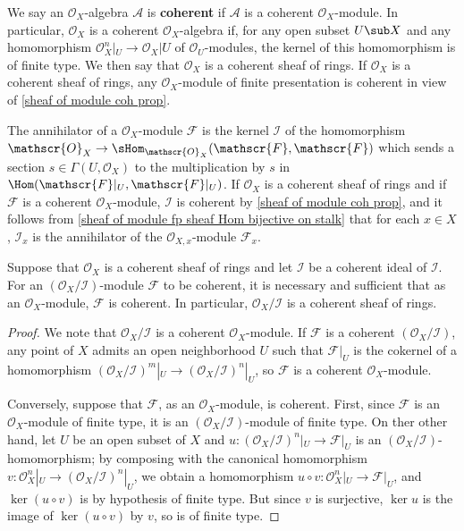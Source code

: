 We say an $\mathscr{O}_X$-algebra $\mathscr{A}$ is \textbf{coherent} if $\mathscr{A}$ is a coherent $\mathscr{O}_X$-module. In particular, $\mathscr{O}_X$ is a coherent $\mathscr{O}_X$-algebra if, for any open subset $U\sub X$ and any homomorphism $\mathscr{O}_X^n|_U\to\mathscr{O}_X|U$ of $\mathscr{O}_U$-modules, the kernel of this homomorphism is of finite type. We then say that $\mathscr{O}_X$ is a coherent sheaf of rings. If $\mathscr{O}_X$ is a coherent sheaf of rings, any $\mathscr{O}_X$-module of finite presentation is coherent in view of \cref{sheaf of module coh prop}.
\begin{example}
The annihilator of a $\mathscr{O}_X$-module $\mathscr{F}$ is the kernel $\mathscr{I}$ of the homomorphism $\mathscr{O}_X\to\sHom_{\mathscr{O}_X}(\mathscr{F},\mathscr{F})$ which sends a section $s\in\Gamma(U,\mathscr{O}_X)$ to the multiplication by $s$ in $\Hom(\mathscr{F}|_U,\mathscr{F}|_U)$. If $\mathscr{O}_X$ is a coherent sheaf of rings and if $\mathscr{F}$ is a coherent $\mathscr{O}_X$-module, $\mathscr{I}$ is coherent by \cref{sheaf of module coh prop}, and it follows from \cref{sheaf of module fp sheaf Hom bijective on stalk} that for each $x\in X$, $\mathscr{I}_x$ is the annihilator of the $\mathscr{O}_{X,x}$-module $\mathscr{F}_x$.
\end{example}
\begin{proposition}\label{sheaf of module O/I coh iff}
Suppose that $\mathscr{O}_X$ is a coherent sheaf of rings and let $\mathscr{I}$ be a coherent ideal of $\mathscr{I}$. For an $(\mathscr{O}_X/\mathscr{I})$-module $\mathscr{F}$ to be coherent, it is necessary and sufficient that as an $\mathscr{O}_X$-module, $\mathscr{F}$ is coherent. In particular, $\mathscr{O}_X/\mathscr{I}$ is a coherent sheaf of rings.
\end{proposition}
\begin{proof}
We note that $\mathscr{O}_X/\mathscr{I}$ is a coherent $\mathscr{O}_X$-module. If $\mathscr{F}$ is a coherent $(\mathscr{O}_X/\mathscr{I})$, any point of $X$ admits an open neighborhood $U$ such that $\mathscr{F}|_U$ is the cokernel of a homomorphism $(\mathscr{O}_X/\mathscr{I})^m|_U\to (\mathscr{O}_X/\mathscr{I})^n|_U$, so $\mathscr{F}$ is a coherent $\mathscr{O}_X$-module.\par
Conversely, suppose that $\mathscr{F}$, as an $\mathscr{O}_X$-module, is coherent. First, since $\mathscr{F}$ is an $\mathscr{O}_X$-module of finite type, it is an $(\mathscr{O}_X/\mathscr{I})$-module of finite type. On ther other hand, let $U$ be an open subset of $X$ and $u:(\mathscr{O}_X/\mathscr{I})^n|_U\to\mathscr{F}|_U$ is an $(\mathscr{O}_X/\mathscr{I})$-homomorphism; by composing with the canonical homomorphism $v:\mathscr{O}_X^n|_U\to(\mathscr{O}_X/\mathscr{I})^n|_U$, we obtain a homomorphism $u\circ v:\mathscr{O}_X^n|_U\to\mathscr{F}|_U$, and $\ker(u\circ v)$ is by hypothesis of finite type. But since $v$ is surjective, $\ker u$ is the image of $\ker(u\circ v)$ by $v$, so is of finite type.
\end{proof}
